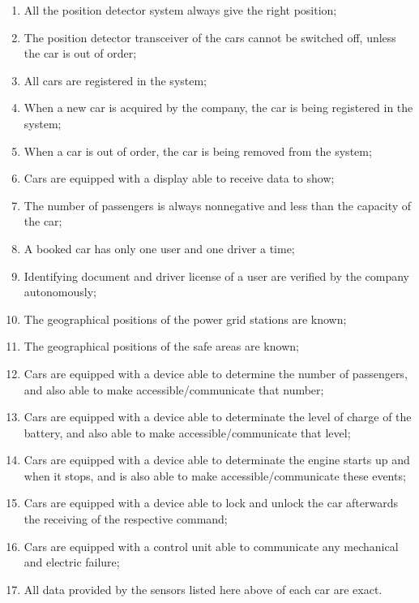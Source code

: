 \documentclass{scrreprt}
\begin{document}
\begin{enumerate} [label=D\arabic*., start=1]
\item All the position detector system always give the right position;
\item The position detector transceiver of the cars cannot be switched off, unless the car is out of order;
\item All cars are registered in the system;
\item When a new car is acquired by the company, the car is being registered in the system;
\item When a car is out of order, the car is being removed from the system;
\item Cars are equipped with a display able to receive data to show;
\item The number of passengers is always nonnegative and less than the capacity of the car;
\item A booked car has only one user and one driver a time;
\item Identifying document and driver license of a user are verified by the company autonomously;
\item The geographical positions of the power grid stations are known;
\item The geographical positions of the safe areas are known;
\item Cars are equipped with a device able to determine the number of passengers, and also able to make accessible/communicate that number;
\item Cars are equipped with a device able to determinate the level of charge of the battery, and also able to make accessible/communicate that level;
\item Cars are equipped with a device able to determinate the engine starts up and when it stops, and is also able to make accessible/communicate these events;
\item Cars are equipped with a device able to lock and unlock the car afterwards the receiving of the respective command;
\item Cars are equipped with a control unit able to communicate any mechanical and electric failure;
\item All data provided by the sensors listed here above of each car are exact.
\end{enumerate}

\begin{comment}$<$List any assumed factors (as opposed to known facts) that could affect the 
requirements stated in the SRS. These could include third-party or commercial 
components that you plan to use, issues around the development or operating 
environment, or constraints. The project could be affected if these assumptions 
are incorrect, are not shared, or change. Also identify any dependencies the 
project has on external factors, such as software components that you intend to 
reuse from another project, unless they are already documented elsewhere (for 
example, in the vision and scope document or the project plan).$>$
\end{comment}
\end{document}
